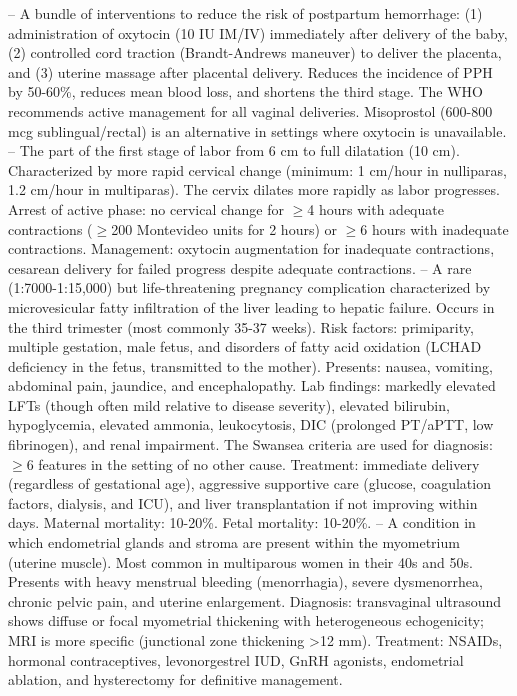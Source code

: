 -- A bundle of interventions to reduce the risk of postpartum hemorrhage: (1) administration of oxytocin (10 IU IM/IV) immediately after delivery of the baby, (2) controlled cord traction (Brandt-Andrews maneuver) to deliver the placenta, and (3) uterine massage after placental delivery. Reduces the incidence of PPH by 50-60\%, reduces mean blood loss, and shortens the third stage. The WHO recommends active management for all vaginal deliveries. Misoprostol (600-800 mcg sublingual/rectal) is an alternative in settings where oxytocin is unavailable.
-- The part of the first stage of labor from 6 cm to full dilatation (10 cm). Characterized by more rapid cervical change (minimum: 1 cm/hour in nulliparas, 1.2 cm/hour in multiparas). The cervix dilates more rapidly as labor progresses. Arrest of active phase: no cervical change for \(\ge\)4 hours with adequate contractions (\(\ge\)200 Montevideo units for 2 hours) or \(\ge\)6 hours with inadequate contractions. Management: oxytocin augmentation for inadequate contractions, cesarean delivery for failed progress despite adequate contractions.
-- A rare (1:7000-1:15,000) but life-threatening pregnancy complication characterized by microvesicular fatty infiltration of the liver leading to hepatic failure. Occurs in the third trimester (most commonly 35-37 weeks). Risk factors: primiparity, multiple gestation, male fetus, and disorders of fatty acid oxidation (LCHAD deficiency in the fetus, transmitted to the mother). Presents: nausea, vomiting, abdominal pain, jaundice, and encephalopathy. Lab findings: markedly elevated LFTs (though often mild relative to disease severity), elevated bilirubin, hypoglycemia, elevated ammonia, leukocytosis, DIC (prolonged PT/aPTT, low fibrinogen), and renal impairment. The Swansea criteria are used for diagnosis: \(\ge\)6 features in the setting of no other cause. Treatment: immediate delivery (regardless of gestational age), aggressive supportive care (glucose, coagulation factors, dialysis, and ICU), and liver transplantation if not improving within days. Maternal mortality: 10-20\%. Fetal mortality: 10-20\%.
-- A condition in which endometrial glands and stroma are present within the myometrium (uterine muscle). Most common in multiparous women in their 40s and 50s. Presents with heavy menstrual bleeding (menorrhagia), severe dysmenorrhea, chronic pelvic pain, and uterine enlargement. Diagnosis: transvaginal ultrasound shows diffuse or focal myometrial thickening with heterogeneous echogenicity; MRI is more specific (junctional zone thickening >12 mm). Treatment: NSAIDs, hormonal contraceptives, levonorgestrel IUD, GnRH agonists, endometrial ablation, and hysterectomy for definitive management.


